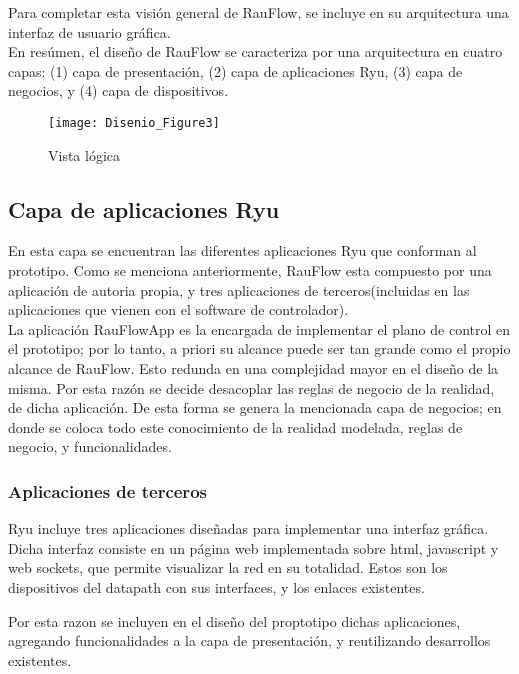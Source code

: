 Para completar esta visi\'on general de RauFlow, se incluye en su arquitectura una interfaz de usuario gr\'afica.\\ 

En res\'umen, el dise\~no de RauFlow se caracteriza por una arquitectura en cuatro capas: (1) capa de presentación, (2) capa de aplicaciones Ryu, (3) capa de negocios, y (4) capa de dispositivos.\\

\begin{figure}[ht!] 
\centering    
\texttt{[image: Disenio\_Figure3]}
\caption[Vista l\'ogica]{Vista l\'ogica}
\label{fig:VistaComponentes2}
\end{figure}

\subsection{Capa de aplicaciones Ryu}
En esta capa se encuentran las diferentes aplicaciones Ryu que conforman al prototipo. Como se menciona anteriormente, RauFlow esta compuesto por una aplicaci\'on de autoria propia, y tres aplicaciones de terceros(incluidas en las aplicaciones que vienen con el software de controlador).\\

La aplicaci\'on RauFlowApp es la encargada de implementar el plano de control en el prototipo; por lo tanto, a priori su alcance puede ser tan grande como el propio alcance de RauFlow. Esto redunda en una complejidad mayor en el dise\~no de la misma. Por esta razón se decide desacoplar las reglas de negocio de la realidad, de dicha aplicación. De esta forma se genera la mencionada capa de negocios; en donde se coloca todo este conocimiento de la realidad modelada, reglas de negocio, y funcionalidades.  

\subsubsection{Aplicaciones de terceros}
Ryu incluye tres aplicaciones dise\~nadas para implementar una interfaz gr\'afica. Dicha interfaz consiste en un p\'agina web implementada sobre html, javascript y web sockets, que permite visualizar la red en su totalidad. Estos son los dispositivos del datapath con sus interfaces, y los enlaces existentes.

Por esta razon se incluyen en el dise\~no del proptotipo dichas aplicaciones, agregando funcionalidades  a la capa de presentaci\'on, y reutilizando desarrollos existentes.

